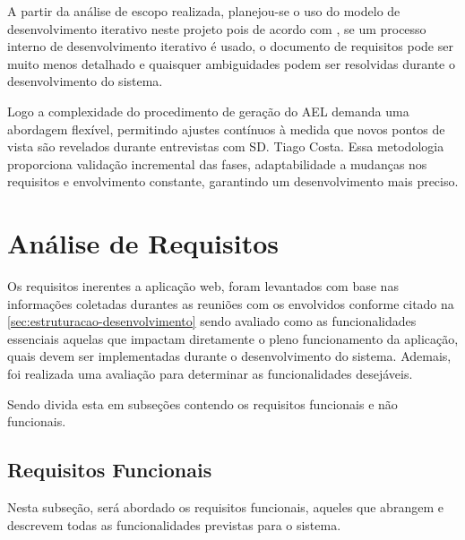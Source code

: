 A partir da análise de escopo realizada, planejou-se o uso do modelo de desenvolvimento iterativo neste projeto pois de acordo com , se um processo interno de desenvolvimento iterativo é usado, o documento de requisitos pode ser muito menos detalhado e quaisquer ambiguidades podem ser resolvidas durante o desenvolvimento do sistema.

Logo a complexidade do procedimento de geração do AEL demanda uma abordagem flexível, permitindo ajustes contínuos à medida que novos pontos de vista são revelados durante entrevistas com SD. Tiago Costa. Essa metodologia proporciona validação incremental das fases, adaptabilidade a mudanças nos requisitos e envolvimento constante, garantindo um desenvolvimento mais preciso.


\section{Análise de Requisitos}
Os requisitos inerentes a aplicação web, foram levantados com base nas informações coletadas durantes as reuniões com os envolvidos conforme citado na \autoref{sec:estruturacao-desenvolvimento} sendo avaliado como as funcionalidades essenciais aquelas que impactam diretamente o pleno funcionamento da aplicação, quais devem ser implementadas durante o desenvolvimento do sistema. Ademais, foi realizada uma avaliação para determinar as funcionalidades desejáveis.

Sendo divida esta em subseções contendo os requisitos funcionais e não funcionais.

\subsection{Requisitos Funcionais}
Nesta subseção, será abordado os requisitos funcionais, aqueles que abrangem e descrevem todas as funcionalidades previstas para o sistema. 

